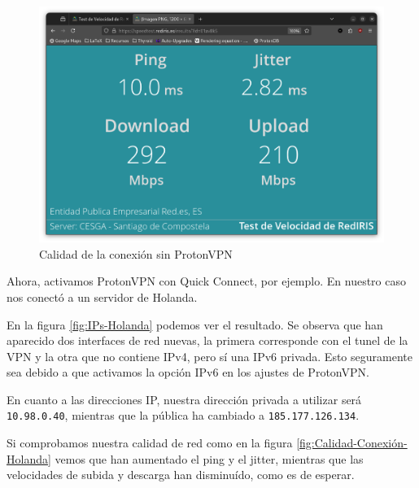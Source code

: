 \begin{figure}[H]
    \centering
    \includegraphics[width=\linewidth]{CalidadConexion.png}
    \caption{Calidad de la conexión sin ProtonVPN}
    \label{fig:Calidad-Conexión}
\end{figure}


Ahora, activamos ProtonVPN con Quick Connect, por ejemplo. En nuestro caso nos conectó a un servidor de Holanda.

En la figura \ref{fig:IPs-Holanda} podemos ver el resultado. Se observa que han aparecido dos interfaces de red nuevas, la primera corresponde con el tunel de la VPN y la otra que no contiene IPv4, pero sí una IPv6 privada. Esto seguramente sea debido a que activamos la opción IPv6 en los ajustes de ProtonVPN.

En cuanto a las direcciones IP, nuestra dirección privada a utilizar será \texttt{10.98.0.40}, mientras que la pública ha cambiado a \texttt{185.177.126.134}.

Si comprobamos nuestra calidad de red como en la figura \ref{fig:Calidad-Conexión-Holanda} vemos que han aumentado el ping y el jitter, mientras que las velocidades de subida y descarga han disminuído, como es de esperar.

